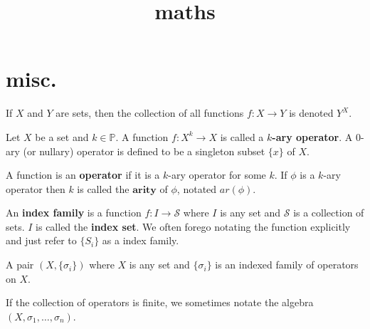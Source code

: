 

%


\title{maths}

\maketitle


\section{misc.}

\begin{definition}
\label{def-collection-all-functions}

If $X$ and $Y$ are sets, then the collection of all functions $f: X \rightarrow Y$ is denoted $Y^X$.

\end{definition}

\begin{definition}
\label{def-k-ary-operator}

Let $X$ be a set and $k \in \mathbb{P}$. A function $f: X^k \rightarrow X$ is called a \textbf{$k$-ary operator}. A $0$-ary (or nullary) operator is defined to be a singleton subset $\{x\}$ of $X$.

A function is an \textbf{operator} if it is a $k$-ary operator for some $k$. If $\phi$ is a $k$-ary operator then $k$ is called the $\textbf{arity}$ of $\phi$, notated $ar(\phi)$.

\end{definition}


\begin{definition}
\label{def-indexed-family}

An \textbf{index family} is a function $f: I \rightarrow \mathcal{S}$ where $I$ is any set and $\mathcal{S}$ is a collection of sets. $I$ is called the \textbf{index set}. We often forego notating the function explicitly and just refer to $\{S_i\}$ as a index family.

\end{definition}


\begin{definition}
\label{def-abstract-algebra}

A pair $(X, \{\sigma_i\})$ where $X$ is any set and $\{\sigma_i\}$ is an indexed family of operators on $X$.

If the collection of operators is finite, we sometimes notate the algebra $(X, \sigma_1, \ldots, \sigma_n)$.
    
\end{definition}


